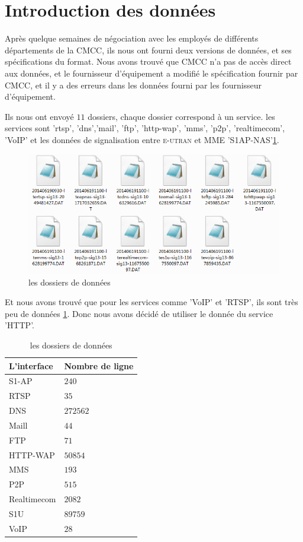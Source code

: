 \section{Introduction des données}
Après quelque semaines de négociation avec les employés de différents départements de la CMCC, ils nous ont fourni deux versions de données, et ses spécifications du format\cite{specifi}. Nous avons trouvé que CMCC n'a pas de accès direct aux données, et le fournisseur d'équipement a modifié le spécification fournir par CMCC, et il y a des erreurs dans les données fourni par les fournisseur d'équipement.

Ils nous ont envoyé $11$ dossiers, chaque dossier correspond à un service. les services sont 'rtsp', 'dns','mail', 'ftp', 'http-wap', 'mms', 'p2p', 'realtimecom', 'VoIP' et les données de signalisation entre \textsc{e-utran} et MME 'S1AP-NAS'\ref{dossier}. 
      \begin{figure}[H]
          \centering
          \includegraphics[width=5in]{images/data.png}
          \caption{les dossiers de données}
          \label{dossier}
      \end{figure}
Et nous avons trouvé que pour les services comme 'VoIP' et 'RTSP', ils sont très peu de données \ref{table.nombre}. Donc nous avons décidé de utiliser le donnée du service 'HTTP'.

\begin{table}[H]
\centering
	\begin{tabular}{|>{\centering\arraybackslash}p{4 cm}|>{\centering\arraybackslash}p{4 cm}|}
	\hline \textsf{L'interface }& \textsf{Nombre de ligne} \\ 
	\hline S1-AP & $240$ \\ 
	\hline RTSP &$ 35$ \\ 
	\hline DNS  & $272562$ \\ 
	\hline Maill & $44$ \\ 
	\hline FTP &$ 71$ \\ 
	\hline HTTP-WAP & $50854$ \\ 
	\hline MMS & $193$ \\ 
	\hline P2P & $515$ \\ 
	\hline Realtimecom & $2082$ \\ 
	\hline S1U &$ 89759$ \\ 
	\hline VoIP & $28$ \\ 
	\hline 
	\end{tabular} 
	\caption{les dossiers de données}
	          \label{table.nombre}
\end{table}



